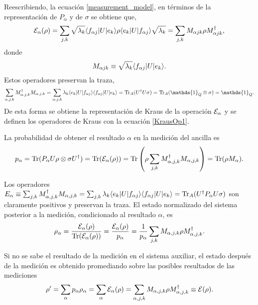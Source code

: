 Reescribiendo, la ecuación {\ref{measurement_model}}, en términos de la representación de $P_\alpha$ y de $\sigma$ se obtiene que,
\begin{equation}
    \mathcal{E}_\alpha(\rho)=\sum_{j,k}\sqrt{\lambda_k}\langle f_{\alpha j}|U|e_k\rangle \rho \langle e_k|U|f_{\alpha j}\rangle \sqrt{\lambda_k}=\sum_{j,k}M_{\alpha j k}\rho M_ {\alpha j k}^\dagger,
\end{equation} donde \begin{equation} \label{KrausOp1}
    M_{\alpha j k}\equiv \sqrt{\lambda_k}\langle f_{\alpha j}|U|e_k\rangle.
\end{equation}
Estos operadores preservan la traza, \[\sum_{\alpha, j,k} M_{\alpha,j,k}^\dagger M_{\alpha,j,k}=\sum_{\alpha, j,k} \lambda_k \la e_k|U|f_{\alpha j}\ra \la f_{\alpha j}|U|e_k\ra= \tr_A(U^\dagger U \sigma)=\tr_A(\mathds{1}_Q\otimes\sigma)=\mathds{1}_Q.\] De esta forma se obtiene la representación de Kraus de la operación $\mathcal{E}_\alpha$ y se definen los operadores de Kraus con la ecuación {\ref{KrausOp1}}. 

La probabilidad de obtener el resultado $\alpha$ en la medición del ancilla es {\cite{unm2014}} \begin{equation}
    p_\alpha={\rm Tr}(P_\alpha U\rho\otimes\sigma U^\dagger)={\rm Tr}(\mathcal{E}_\alpha(\rho))={\rm Tr}\left(\rho \sum _{j,k} M_{\alpha, j,k}^\dagger M_{\alpha,j,k}\right)={\rm Tr}(\rho M_\alpha).
\end{equation}

Los operadores $E_\alpha \equiv \sum _{j,k} M_{\alpha, j,k}^\dagger M_{\alpha,j,k}=\sum_{j,k} \lambda_k \langle e_k|U|f_{\alpha j}\rangle \langle f_{\alpha j}|U|e_k\rangle={\rm Tr}_A(U^\dagger P_\alpha U\sigma) $ son claramente positivos y preservan la traza. El estado normalizado del sistema posterior a la medición, condicionado al resultado $\alpha$, es {\cite{unm2014}} \begin{equation}
    \rho_\alpha =\dfrac{\mathcal{E}_\alpha (\rho)}{{\rm Tr}(\mathcal{E}_\alpha(\rho))}=\dfrac{\mathcal{E}_\alpha(\rho)}{p_\alpha}=\dfrac{1}{p_\alpha}\sum_{j,k}M_{\alpha,j,k}\rho M_{\alpha,j,k}^\dagger.
\end{equation}

Si no se sabe el resultado de la medición en el sistema auxiliar, el estado después de la medición es obtenido promediando sobre las posibles resultados de las mediciones {\cite{unm2014}}
\begin{equation}
    \rho'=\sum_\alpha p_\alpha \rho_\alpha=\sum_\alpha \mathcal{E}_\alpha(\rho)=\sum_{\alpha,j,k} M_{\alpha,j,k}\rho M_{\alpha,j,k}^\dagger\equiv\mathcal{E}(\rho).
\end{equation}


